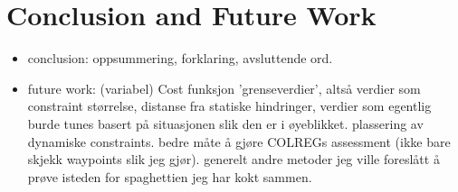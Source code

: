 \section{Conclusion and Future Work}
\begin{itemize}
    \item conclusion:
    \subitem oppsummering, forklaring, avsluttende ord.
    \item future work:
    \subitem (variabel) Cost funksjon
    \subitem 'grenseverdier', altså verdier som constraint størrelse, distanse fra statiske hindringer, verdier som egentlig burde tunes basert på situasjonen slik den er i øyeblikket.
    \subitem plassering av dynamiske constraints.
    \subitem bedre måte å gjøre COLREGs assessment (ikke bare skjekk waypoints slik jeg gjør).
    \subitem generelt andre metoder jeg ville foreslått å prøve isteden for spaghettien jeg har kokt sammen.
\end{itemize}

\newpage